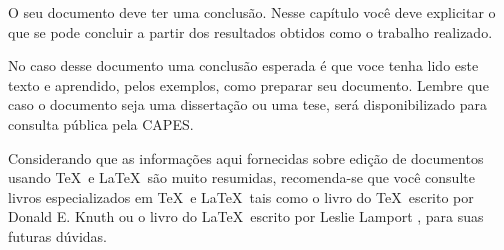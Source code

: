 
O seu documento deve ter uma conclusão. Nesse capítulo  você deve explicitar o que se pode concluir a partir dos resultados obtidos como o trabalho realizado. 

No caso desse documento uma conclusão esperada é que voce tenha lido este texto e aprendido, pelos exemplos, como preparar seu documento. Lembre que caso o documento seja uma dissertação ou uma tese, será disponibilizado para consulta pública pela CAPES. 

Considerando que as informações aqui fornecidas sobre edição de documentos usando \TeX \ e \LaTeX \ são muito resumidas, recomenda-se que você consulte livros especializados em \TeX \ e \LaTeX \ tais como o livro do \TeX \ escrito por Donald E. Knuth \cite{texbook} ou o livro do \LaTeX \ escrito por Leslie Lamport \cite{latexbook}, para suas futuras dúvidas.
%
%
%
%
